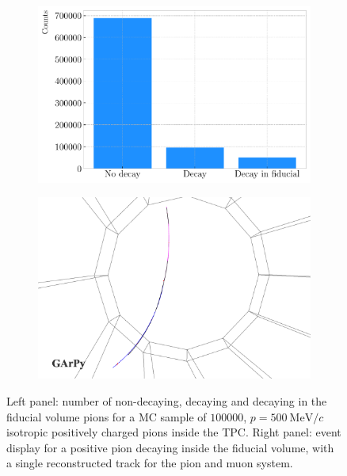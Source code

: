 \begin{figure}[t]
	\begin{subfigure}{0.5\textwidth}
		\centering
		\includegraphics[width=.99\linewidth]{Images/GArSoft_PID/pion_decay/pion_decay_status.pdf}
	\end{subfigure}
	\begin{subfigure}{0.5\textwidth}
		\centering
		\includegraphics[width=.99\linewidth]{Images/GArSoft_PID/pion_decay/pion_decay_evd.png}
	\end{subfigure}
	\caption{Left panel: number of non-decaying, decaying and decaying in the fiducial volume pions for a MC sample of $100000$, $p=500 \ \mathrm{MeV}/c$ isotropic positively charged pions inside the TPC. Right panel: event display for a positive pion decaying inside the fiducial volume, with a single reconstructed track for the pion and muon system.}
	\label{fig:pion_decays}
\end{figure}

